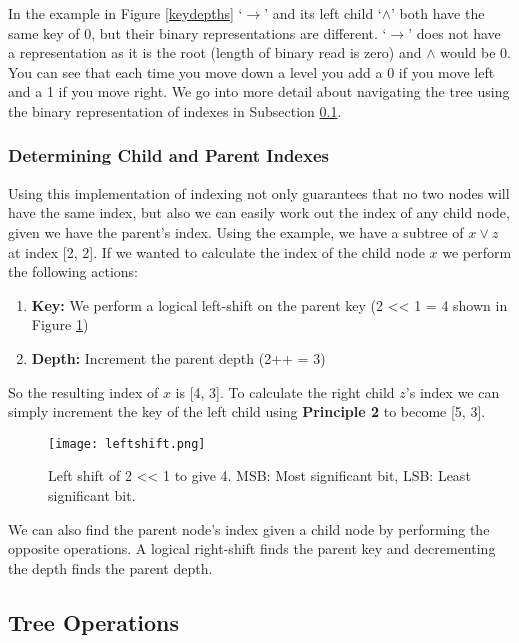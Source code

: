 \documentclass{report}
\begin{document}
In the example in Figure \ref{keydepths} `$\rightarrow$' and its left child `$\land$' both have the same key of 0, but their binary representations are different. `$\rightarrow$' does not have a representation as it is the root (length of binary read is zero) and $\land$ would be 0. You can see that each time you move down a level you add a 0 if you move left and a 1 if you move right. We go into more detail about navigating the tree using the binary representation of indexes in Subsection \ref{sub:tree_operations}.

\subsubsection{Determining Child and Parent Indexes}

Using this implementation of indexing not only guarantees that no two nodes will have the same index, but also we can easily work out the index of any child node, given we have the parent's index. Using the example, we have a subtree of $x\lor z$ at index [2, 2]. If we wanted to calculate the index of the child node $x$ we perform the following actions:

\begin{enumerate}
    \item \textbf{Key:} We perform a logical left-shift on the parent key (2 << 1 = 4 shown in Figure \ref{leftshift})
    \item \textbf{Depth:} Increment the parent depth (2++ = 3)
\end{enumerate}

So the resulting index of $x$ is [4, 3]. To calculate the right child $z$'s index we can simply increment the key of the left child using \textbf{Principle 2} to become [5, 3].

\begin{figure}[ht]
    \centering
    \texttt{[image: leftshift.png]}
    \caption{Left shift of 2 << 1 to give 4. MSB: Most significant bit, LSB: Least significant bit.}
    \label{leftshift}
\end{figure}

We can also find the parent node's index given a child node by performing the opposite operations. A logical right-shift finds the parent key and decrementing the depth finds the parent depth.

\subsection{Tree Operations}
\label{sub:tree_operations}
\end{document}
